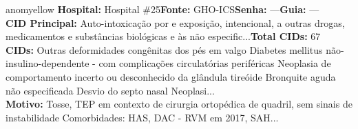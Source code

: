 \documentclass[a4paper,10pt]{article}
\begin{document}
\begin{anomalycard}[Interna\c{c}\~{a}o \#410 | Pac. \#482 | MODERADO (z=2.06) | LOS: 2d | 03/03/2026\,$\to$\,05/03/2026]{anomyellow}
\textbf{Hospital:} Hospital \#25\quad \textbf{Fonte:} GHO-ICS\quad \textbf{Senha:} ---\quad \textbf{Guia:} ---\\

\textbf{CID Principal:} {\small Auto-intoxicação por e exposição, intencional, a outras drogas, medicamentos e substâncias biológicas e às não especific...}\quad\textbf{Total CIDs:} 67\\

\textbf{CIDs:} {\scriptsize Outras deformidades congênitas dos pés em valgo \textbar{} Diabetes mellitus não-insulino-dependente - com complicações circulatórias periféricas \textbar{} Neoplasia de comportamento incerto ou desconhecido da glândula tireóide \textbar{} Bronquite aguda não especificada \textbar{} Desvio do septo nasal \textbar{} Neoplasi...}\\

\textbf{Motivo:} {\scriptsize Tosse, TEP em contexto de cirurgia ortopédica de quadril, sem sinais de instabilidade  Comorbidades: HAS, DAC - RVM em 2017, SAH...}\\

\end{anomalycard}
\end{document}
